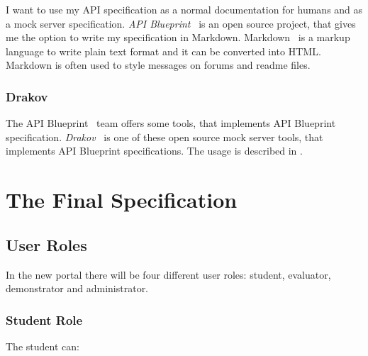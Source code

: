 I want to use my API specification as a normal documentation for humans and as a mock server specification. \emph{API Blueprint}~\cite{api-blueprint} is an open source project, that gives me the option to write my specification in Markdown. Markdown~\cite{markdown} is a markup language to write plain text format and it can be converted into HTML. Markdown is often used to style messages on forums and readme files. 

\subsubsection{Drakov}

The API Blueprint~\cite{api-blueprint} team offers some tools, that implements API Blueprint specification. \emph{Drakov}~\cite{drakov} is one of these open source mock server tools, that implements API Blueprint specifications. The usage is described in .

\section{The Final Specification} \label{final-spec}
\subsection{User Roles}

In the new portal there will be four different user roles: student, evaluator, demonstrator and administrator. 

\subsubsection{Student Role}

The student can:


